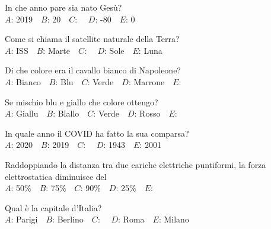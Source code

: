 \mcquestionfooter



\def\mcquestionnumber{4}


\mcquestionheader In che anno pare sia nato Gesù?\\
{$A$}: 2019\ \ {$B$}: 20\ \ {$C$}: \ \ {$D$}: -80\ \ {$E$}: 0\ \ 

\mcquestionfooter



\def\mcquestionnumber{5}


\mcquestionheader Come si chiama il satellite naturale della Terra?\\
{$A$}: ISS\ \ {$B$}: Marte\ \ {$C$}: \ \ {$D$}: Sole\ \ {$E$}: Luna\ \ 

\mcquestionfooter



\def\mcquestionnumber{6}


\mcquestionheader Di che colore era il cavallo bianco di Napoleone?\\
{$A$}: Bianco\ \ {$B$}: Blu\ \ {$C$}: Verde\ \ {$D$}: Marrone\ \ {$E$}: \ \ 

\mcquestionfooter



\def\mcquestionnumber{7}


\mcquestionheader Se mischio blu e giallo che colore ottengo?\\
{$A$}: Giallu\ \ {$B$}: Blallo\ \ {$C$}: Verde\ \ {$D$}: Rosso\ \ {$E$}: \ \ 

\mcquestionfooter



\def\mcquestionnumber{8}


\mcquestionheader In quale anno il COVID ha fatto la sua comparsa?\\
{$A$}: 2020\ \ {$B$}: 2019\ \ {$C$}: \ \ {$D$}: 1943\ \ {$E$}: 2001\ \ 

\mcquestionfooter



\def\mcquestionnumber{9}


\mcquestionheader Raddoppiando la distanza tra due cariche elettriche puntiformi, la forza elettrostatica diminuisce del\\
{$A$}: 50\%\ \ {$B$}: 75\%\ \ {$C$}: 90\%\ \ {$D$}: 25\%\ \ {$E$}: \ \ 

\mcquestionfooter



\def\mcquestionnumber{10}


\mcquestionheader Qual è la capitale d’Italia?\\
{$A$}: Parigi\ \ {$B$}: Berlino\ \ {$C$}: \ \ {$D$}: Roma\ \ {$E$}: Milano\ \ 

